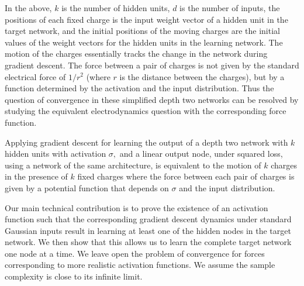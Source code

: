 In the above, $k$ is the number of hidden units, $d$ is the number of inputs, the positions of each fixed charge is the input weight vector of
a hidden unit in the target network, and the initial positions of the moving charges are the initial values of the weight vectors for the hidden units in the learning network. The motion of the charges essentially tracks the change in the network during gradient descent. The force between a pair of charges is not given by the standard electrical force of $1/r^2$ (where $r$ is the distance between the charges), but by a function determined by the activation and the input distribution. Thus the question of convergence in these simplified depth two networks can be resolved by studying the equivalent electrodynamics question with the corresponding force function.
%
\begin{theorem}
Applying gradient descent for learning the output of a depth two network
with $k$ hidden units with activation $\sigma,$ and a linear output
node, under squared loss, using a network of the same architecture,
is equivalent to the motion of $k$ charges in the presence of $k$ fixed charges where the force between each pair of charges is given by a potential function that depends on $\sigma$ and the input distribution.  \end{theorem}
%
Our main technical contribution is to prove the existence of an activation function such that the corresponding gradient descent dynamics under standard Gaussian inputs result in learning at least one of the hidden nodes in the target network. We then show that this allows us to learn the complete target network one node at a time. We leave open the problem of convergence for forces corresponding to more realistic activation functions. We assume the sample complexity is close to its infinite limit. 
%

